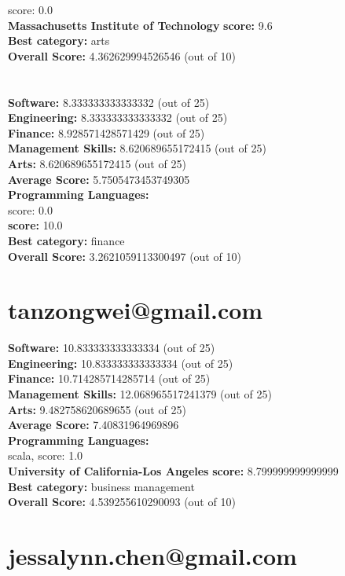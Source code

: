 \documentclass{article}
\begin{document}
score: 0.0\\
\textbf{Massachusetts Institute of Technology} \textbf{score:} 9.6\\
\textbf{Best category: } arts\\
\textbf{Overall Score: }4.362629994526546 (out of 10)\section{}
\textbf{Software:} 8.333333333333332 (out of 25)\\
\textbf{Engineering: } 8.333333333333332 (out of 25)\\
\textbf{Finance:} 8.928571428571429 (out of 25)\\
\textbf{Management Skills:} 8.620689655172415 (out of 25)\\
\textbf{Arts:} 8.620689655172415 (out of 25)\\
\textbf{Average Score: } 5.7505473453749305\\
\textbf{Programming Languages:} \\
score: 0.0\\
 \textbf{score:} 10.0\\
\textbf{Best category: } finance\\
\textbf{Overall Score: }3.2621059113300497 (out of 10)\section{tanzongwei@gmail.com}
\textbf{Software:} 10.833333333333334 (out of 25)\\
\textbf{Engineering: } 10.833333333333334 (out of 25)\\
\textbf{Finance:} 10.714285714285714 (out of 25)\\
\textbf{Management Skills:} 12.068965517241379 (out of 25)\\
\textbf{Arts:} 9.482758620689655 (out of 25)\\
\textbf{Average Score: } 7.40831964969896\\
\textbf{Programming Languages:} \\
scala, score: 1.0\\
\textbf{University of California-Los Angeles} \textbf{score:} 8.799999999999999\\
\textbf{Best category: } business management\\
\textbf{Overall Score: }4.539255610290093 (out of 10)\section{jessalynn.chen@gmail.com}
\end{document}
